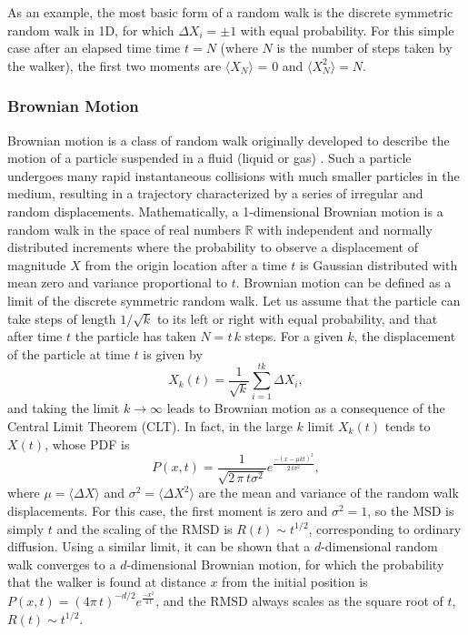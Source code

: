 As an example, the most basic form of a random walk is the discrete symmetric random walk in 1D, for which $\Delta X_{i} = \pm 1$ with equal probability. For this simple case after an elapsed time time $t = N$ (where $N$ is the number of steps taken by the walker), the first two moments are $\langle X_N \rangle$ = 0 and $\langle X_{N}^{2} \rangle = N$. 

\subsubsection{Brownian Motion}
\label{sec:brownian}

Brownian motion is a class of random walk originally developed to describe the motion of a particle suspended in a fluid (liquid or gas) \cite{einstein_1905_movement}. Such a particle undergoes many rapid instantaneous collisions with much smaller particles in the medium, resulting in a trajectory characterized by a series of irregular and random displacements. Mathematically, a 1-dimensional Brownian motion is a random walk in the space of real numbers $\mathbb{R}$ with independent and normally distributed increments where the probability to observe a displacement of magnitude $X$ from the origin location after a time $t$ is Gaussian distributed with mean zero and variance proportional to $t$. Brownian motion can be defined as a limit of the discrete symmetric random walk. Let us assume that the particle can take steps of length $1/\sqrt{k}$ to its left or right with equal probability, and that after time $t$ the particle has taken $N=t\,k$ steps. For a given $k$, the displacement of the particle at time $t$ is given by
\begin{equation}
X_{k}(t) = \frac{1}{\sqrt{k}} \sum_{i=1}^{tk} \Delta X_{i},
\end{equation}
and taking the limit $k \to \infty$ leads to Brownian motion as a consequence of the Central Limit Theorem (CLT). 
In fact, in the large $k$ limit $X_{k}(t)$ tends to $X(t)$, whose PDF is 
\begin{equation}
P(x,t) = \frac{1}{\sqrt{2 \, \pi\, t \sigma^2}} e ^{\frac{-(x-\mu k t)^2}{2\, t \sigma^2}},\label{eq:3}
\end{equation}
where $\mu = \langle \Delta X \rangle$ and $\sigma^2 = \langle \Delta X^2 \rangle$ are the mean and variance of the random walk displacements.
For this case, the first moment is zero and $\sigma^2=1$, so the MSD is simply $t$ and the scaling of the RMSD is $R(t) \sim t^{1/2}$, corresponding to ordinary diffusion. 
Using a similar limit, it can be shown that a $d$-dimensional random walk converges to a $d$-dimensional Brownian motion, for which the probability that the walker is found at distance $x$ from the initial position is 
$P(x,t) = (4 \pi \, t )^{-d/2} e ^{\frac{-x^2}{4\, t}}$,
and the RMSD always scales as the square root of $t$, $R(t) \sim t^{1/2}$.


